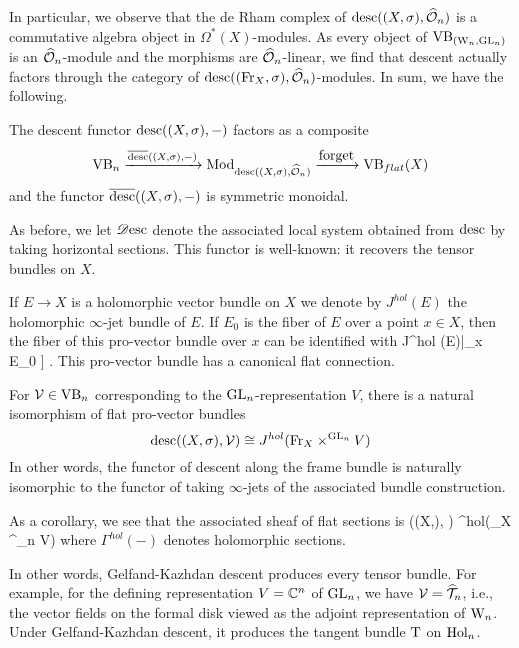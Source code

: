\documentclass[10pt]{amsart}
\begin{document}
In particular, we observe that the de Rham complex of ${\rm desc}((X,\sigma),\widehat{\mathcal O}_n)$ is a commutative algebra object in $\Omega^*(X)$-modules. 
As every object of ${\rm VB}_{({{\rm W}_n}, {\rm GL}_n)}$ is an $\widehat{\mathcal O}_n$-module and the morphisms are $\widehat{\mathcal O}_n$-linear, 
we find that descent actually factors through the category of ${\rm desc}(({\rm Fr}_X,\sigma),\widehat{\mathcal O}_n)$-modules. 
In sum, we have the following.

\begin{lem}
The descent functor ${\rm desc}((X,\sigma),-)$ factors as a composite
\[
\VB_n \xto{\overline{\desc}((X,\sigma),-)} \Mod_{\desc((X,\sigma),\hO_n)} \xto{\txt{forget}} \VB_{flat}(X)
\]
and the functor $\overline{{\rm desc}}((X,\sigma),-)$ is symmetric monoidal.
\end{lem}

As before, we let $\mathscr{D}{\rm esc}$ denote the associated local system obtained from ${\rm desc}$ by taking horizontal sections. This functor is well-known: it recovers the tensor bundles on $X$.

If $E \to X$ is a holomorphic vector bundle on $X$ we denote by
$J^{hol}(E)$ the holomorphic $\infty$-jet bundle of $E$. If
$E_0$ is the fiber of $E$ over a point $x \in X$, then the fiber of
this pro-vector bundle over $x$ can be identified with
\ben
J^{hol} (E)|_{x} \cong E_0 \times \CC [[ t_1,\ldots,t_n]] .
\een
This pro-vector bundle has a canonical flat connection.

\begin{prop}
For $\mathcal{V} \in {\rm VB}_n$ corresponding to the ${\rm GL}_n$-representation $V$,
there is a natural isomorphism of flat pro-vector bundles
\[
{\rm desc}((X, \sigma),\mathcal{V}) \cong J^{hol}({\rm Fr}_X
\times^{{\rm GL}_n} V)
\]
In other words, the functor of descent along the frame bundle is
naturally isomorphic to the functor of taking $\infty$-jets of the associated bundle construction.
\end{prop} 

As a corollary, we see that the associated sheaf of flat sections is
\ben
\sdesc ((X,\sigma), \cV) \cong \Gamma^{hol}(\Fr_X
\times^{\GL_n} V)
\een
where $\Gamma^{hol}(-)$ denotes holomorphic sections. 

In other words, Gelfand-Kazhdan descent produces every tensor bundle. 
For example, for the defining representation $V = \mathbb C^n$ of ${\rm GL}_n$, we have $\mathcal{V} =\widehat{\mathcal T}_n$, 
i.e., the vector fields on the formal disk viewed as the adjoint representation of  ${{\rm W}_n}$. 
Under Gelfand-Kazhdan descent, it produces the tangent bundle ${\rm T}$ on ${\rm Hol}_n$.

\end{document}
